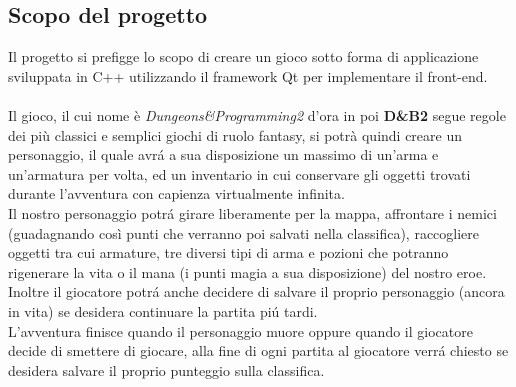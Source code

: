 \documentclass[../relazione.tex]{subfiles}
\begin{document}
\subsection{Scopo del progetto}
\label{ssec:scopo-progetto}
Il progetto si prefigge lo scopo di creare un gioco sotto forma di applicazione sviluppata in C++ utilizzando il framework Qt per implementare il front-end.\\ \\
Il gioco, il cui nome è \textit{Dungeons\&Programming2} d'ora in poi \textbf{D\&B2} segue regole dei più classici e semplici giochi di ruolo fantasy, si potrà quindi
creare un personaggio, il quale avrá a sua disposizione un massimo di un'arma e un'armatura per volta, ed un inventario in cui conservare gli oggetti trovati durante
l'avventura con capienza virtualmente infinita.\\
Il nostro personaggio potrá girare liberamente per la mappa, affrontare i nemici (guadagnando così punti che verranno poi salvati nella classifica), raccogliere oggetti
tra cui armature, tre diversi tipi di arma e pozioni che potranno rigenerare la vita o il mana (i punti magia a sua disposizione) del nostro eroe.\\
Inoltre il giocatore potrá anche decidere di salvare il proprio personaggio (ancora in vita) se desidera continuare la partita piú tardi.\\
L'avventura finisce quando il personaggio muore oppure quando il giocatore decide di smettere di giocare, alla fine di ogni partita al giocatore verrá chiesto se desidera salvare il proprio punteggio sulla classifica.
\end{document}
